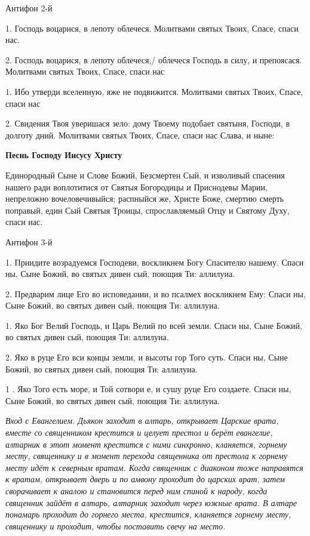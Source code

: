 Антифон 2-й 


1. Господь воцарися, в лепоту облечеся. Молитвами святых Твоих, Спасе, спаси нас. 


2. Господь воцарися, в лепоту облечеся,/ облечеся Господь в силу, и препоясася. Молитвами святых Твоих, Спасе, спаси нас 


1. Ибо утверди вселенную, яже не подвижится. Молитвами святых Твоих, Спасе, спаси нас 


2. Свидения Твоя уверишася зело: дому Твоему подобает святыня, Господи, в долготу дний. Молитвами святых Твоих, Спасе, спаси нас Слава, и ныне:


\medskip
\bfseries  Песнь Господу Иисусу Христу\normalfont{} 


Единородный Сыне и Слове Божий, Безсмертен Сый, и изволивый спасения нашего ради воплотитися от Святыя Богородицы и Приснодевы Марии, непреложно вочеловечивыйся; распныйся же, Христе Боже, смертию смерть поправый, един Сый Святыя Троицы, спрославляемый Отцу и Святому Духу, спаси нас. 

\medskip
Антифон 3-й 


1. Приидите возрадуемся Господеви, воскликнем Богу Спасителю нашему. Спаси ны, Сыне Божий, во святых дивен сый, поющия Ти: аллилуиа. 


2. Предварим лице Его во исповедании, и во псалмех воскликнем Ему: Спаси ны, Сыне Божий, во святых дивен сый, поющия Ти: аллилуиа. 


1. Яко Бог Велий Господь, и Царь Велий по всей земли. Спаси ны, Сыне Божий, во святых дивен сый, поющия Ти: аллилуиа. 


2. Яко в руце Его вси концы земли, и высоты гор Того суть. Спаси ны, Сыне Божий, во святых дивен сый, поющия Ти: аллилуиа. 


1 . Яко Того есть море, и Той сотвори е, и сушу руце Его создаете. Спаси ны, Сыне Божий, во святых дивен сый, поющия Ти: аллилуиа. 


\itshape Вход с Евангелием. Дьякон заходит в алтарь, открывает Царские врата, вместе со священником крестится и целует престол и берёт евангелие, алтарник в этот момент крестится с ними синхронно, кланяется, горнему месту, священнику и в момент перехода священника от престола к горнему месту идёт к северным вратам. Когда священник с диаконом тоже направятся к вратам, открывает дверь и по амвону проходит до царских врат, затем сворачивает к аналою и становится перед ним спиной к народу, когда священник зайдёт в алтарь, алтарник заходит через южные врата. В алтаре понамарь проходит до горнего места, крестится, кланяется горнему месту, священнику и проходит, чтобы поставить свечу на место.\normalfont{}


